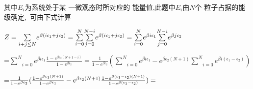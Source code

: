 \documentclass{ctexart}
\begin{document}
其中$E_{i}$为系统处于某%
一微观态时所对应的%
能量值,此题中$E_{i}$由$N$个%
粒子占据的能级确定$,$%
可由下式计算

$Z=\underset{i+j\leq N}{\sum }e^{\beta \left( i\epsilon _{1}+j\epsilon
_{2}\right) }=\underset{i=0}{\overset{N}{\sum }}\underset{j=0}{\overset{N-i}{%
\sum }}e^{\beta \left( i\epsilon _{1}+j\epsilon _{2}\right) }=\underset{i=0}{%
\overset{N}{\sum }}e^{\beta i\epsilon _{1}}\underset{j=0}{\overset{N-i}{\sum 
}}e^{\beta j\epsilon _{2}}$

=$\underset{i=0}{\overset{N}{\sum }}e^{\beta i\epsilon _{1}}\frac{1-e^{\beta
\epsilon _{2}(N+1-i)}}{1-e^{\beta \epsilon _{2}}}=\frac{1}{1-e^{\beta
\epsilon _{2}}}(\underset{i=0}{\overset{N}{\sum }}e^{\beta i\epsilon
_{1}}-e^{\beta \epsilon _{2}(N+1)}\underset{i=0}{\overset{N}{\sum }}e^{\beta
i\left( \epsilon _{1}-\epsilon _{2}\right) })$

=$\frac{1}{1-e^{\beta \epsilon _{2}}}(\frac{1-e^{\beta \epsilon _{1}\left(
N+1\right) }}{1-e^{\beta \epsilon _{1}}}-e^{\beta \epsilon _{2}(N+1)}\frac{%
1-e^{\beta \left( \epsilon _{1}-\epsilon _{2}\right) \left( N+1\right) }}{%
1-e^{\beta \left( \epsilon _{1}-\epsilon _{2}\right) }})=$
\end{document}
